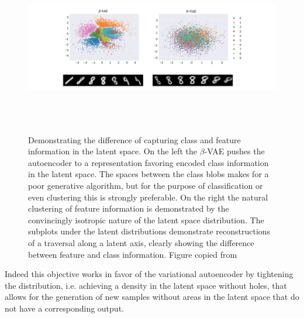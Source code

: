 \begin{figure}
\centering
\includegraphics[width=\textwidth, height=3in]{plots/latent_traversal}
\caption{Demonstrating the difference of capturing class and feature information in the latent space. On the left the $\beta$-VAE pushes the autoencoder to a representation favoring encoded class information in the latent space. The spaces between the class blobs makes for a poor generative algorithm, but for the purpose of classification or even clustering this is strongly preferable. On the right the natural clustering of feature information is demonstrated by the convincingly isotropic nature of the latent space distribution. The subplots under the latent distributions demonstrate reconstructions of a traversal along a latent axis, clearly showing the difference between feature and class information. Figure copied from \citet{Antoran2019}}\label{fig:latent_traversal}
\end{figure}

 Indeed this objective works in favor of the variational autoencoder by tightening the distribution, i.e. achieving a density in the latent space without holes, that allows for the generation of new samples without areas in the latent space that do not have a corresponding output. 

